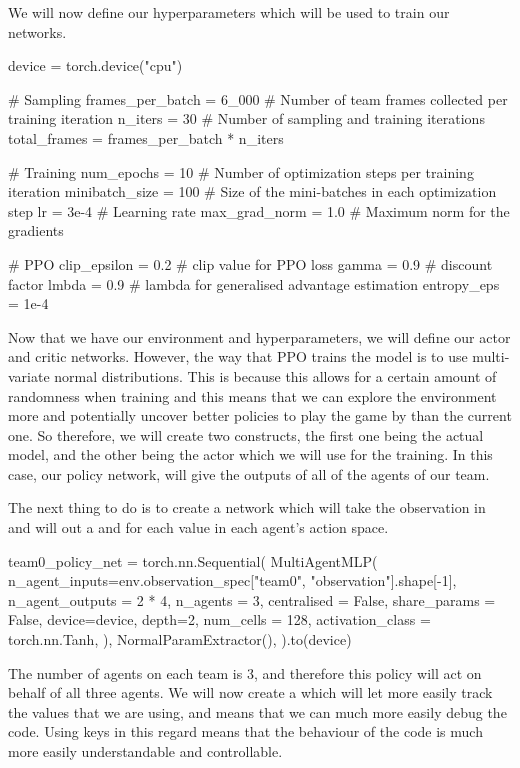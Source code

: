 We will now define our hyperparameters which will be used to train our networks.

\begin{mpy}
device = torch.device("cpu")

# Sampling
frames_per_batch = 6_000  # Number of team frames collected per training iteration
n_iters = 30  # Number of sampling and training iterations
total_frames = frames_per_batch * n_iters

# Training
num_epochs = 10  # Number of optimization steps per training iteration
minibatch_size = 100  # Size of the mini-batches in each optimization step
lr = 3e-4  # Learning rate
max_grad_norm = 1.0  # Maximum norm for the gradients

# PPO
clip_epsilon = 0.2  # clip value for PPO loss
gamma = 0.9  # discount factor
lmbda = 0.9  # lambda for generalised advantage estimation
entropy_eps = 1e-4
\end{mpy}

Now that we have our environment and hyperparameters, we will define our actor and critic networks. However, the way that PPO trains the model is to use multi-variate normal distributions. This is because this allows for a certain amount of randomness when training and this means that we can explore the environment more and potentially uncover better policies to play the game by than the current one. So therefore, we will create two constructs, the first one being the actual model, and the other being the actor which we will use for the training. In this case, our policy network, will give the outputs of all of the agents of our team.

\vs
The next thing to do is to create a  network which will take the observation in and will out a  and  for each value in each agent's action space.

\begin{mpy}
team0_policy_net = torch.nn.Sequential(
    MultiAgentMLP(
        n_agent_inputs=env.observation_spec["team0", "observation"].shape[-1],
        n_agent_outputs = 2 * 4,
        n_agents = 3,
        centralised = False,
        share_params = False,
        device=device,
        depth=2,
        num_cells = 128,
        activation_class = torch.nn.Tanh,
    ),
    NormalParamExtractor(),
).to(device)

\end{mpy}

The number of agents on each team is 3, and therefore this policy will act on behalf of all three agents. We will now create a  which will let  more easily track the values that we are using, and means that we can much more easily debug the code. Using keys in this regard means that the behaviour of the code is much more easily understandable and controllable.

